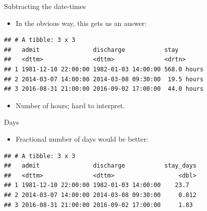 \documentclass[ignorenonframetext,]{beamer}
\newenvironment{Shaded}{\begin{snugshade}}{\end{snugshade}}
\newcommand{\DataTypeTok}[1]{\textcolor[rgb]{0.13,0.29,0.53}{#1}}
\newcommand{\DecValTok}[1]{\textcolor[rgb]{0.00,0.00,0.81}{#1}}
\newcommand{\KeywordTok}[1]{\textcolor[rgb]{0.13,0.29,0.53}{\textbf{#1}}}
\newcommand{\NormalTok}[1]{#1}
\newcommand{\OperatorTok}[1]{\textcolor[rgb]{0.81,0.36,0.00}{\textbf{#1}}}
\newcommand{\StringTok}[1]{\textcolor[rgb]{0.31,0.60,0.02}{#1}}
\providecommand{\tightlist}{%
  \setlength{\itemsep}{0pt}\setlength{\parskip}{0pt}}
\begin{document}
\begin{frame}[fragile]{Subtracting the date-times}
\protect\hypertarget{subtracting-the-date-times}{}

\begin{itemize}
\tightlist
\item
  In the obvious way, this gets us an answer:
\end{itemize}

\begin{Shaded}
\end{Shaded}

\begin{verbatim}
## # A tibble: 3 x 3
##   admit               discharge           stay       
##   <dttm>              <dttm>              <drtn>     
## 1 1981-12-10 22:00:00 1982-01-03 14:00:00 568.0 hours
## 2 2014-03-07 14:00:00 2014-03-08 09:30:00  19.5 hours
## 3 2016-08-31 21:00:00 2016-09-02 17:00:00  44.0 hours
\end{verbatim}

\begin{itemize}
\tightlist
\item
  Number of hours; hard to interpret.
\end{itemize}

\end{frame}

\begin{frame}[fragile]{Days}
\protect\hypertarget{days}{}

\begin{itemize}
\tightlist
\item
  Fractional number of days would be better:
\end{itemize}

\begin{Shaded}
\end{Shaded}

\begin{verbatim}
## # A tibble: 3 x 3
##   admit               discharge           stay_days
##   <dttm>              <dttm>                  <dbl>
## 1 1981-12-10 22:00:00 1982-01-03 14:00:00    23.7  
## 2 2014-03-07 14:00:00 2014-03-08 09:30:00     0.812
## 3 2016-08-31 21:00:00 2016-09-02 17:00:00     1.83
\end{verbatim}

\end{frame}
\end{document}

